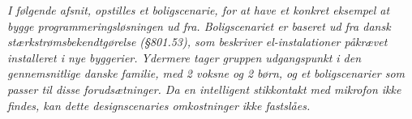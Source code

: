 
\textit{I følgende afsnit, opstilles et boligscenarie, for at have et konkret eksempel at bygge programmeringsløsningen ud fra. Boligscenariet er baseret ud fra dansk stærkstrømsbekendtgørelse (§801.53)\cite{staerkstroemsbekendelse}, som beskriver el-instalationer påkrævet installeret i nye byggerier. Ydermere tager gruppen udgangspunkt i den gennemsnitlige danske familie, med 2 voksne og 2 børn, og et boligscenarier som passer til disse forudsætninger. Da en intelligent stikkontakt med mikrofon ikke findes, kan dette designscenaries omkostninger ikke fastslåes.}\\